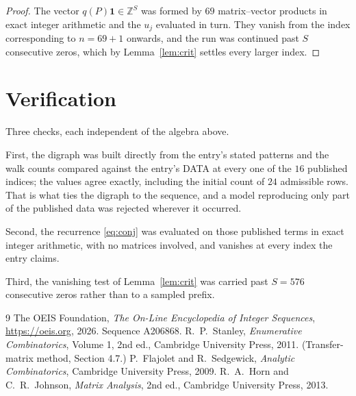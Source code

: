 \documentclass[11pt,a4paper]{article}
\theoremstyle{plain}
\theoremstyle{definition}
\begin{document}
\begin{proof}
The vector $q(P)\mathbf{1}\in\mathbb{Z}^{S}$ was formed by $69$ matrix--vector
products in exact integer arithmetic and the $u_j$ evaluated in turn. They vanish from the
index corresponding to $n=69+1$ onwards, and the run was continued past $S$ consecutive
zeros, which by Lemma~\ref{lem:crit} settles every larger index.
\end{proof}

\section{Verification}

Three checks, each independent of the algebra above.

First, the digraph was built directly from the entry's stated patterns and the walk counts
compared against the entry's DATA at every one of the $16$ published indices; the
values agree exactly, including the initial count of $24$ admissible rows. That is
what ties the digraph to the sequence, and a model reproducing only part of the published
data was rejected wherever it occurred.

Second, the recurrence \eqref{eq:conj} was evaluated on those published terms in exact
integer arithmetic, with no matrices involved, and vanishes at every index the entry claims.

Third, the vanishing test of Lemma~\ref{lem:crit} was carried past $S=576$ consecutive
zeros rather than to a sampled prefix.

\begin{thebibliography}{9}
 The OEIS Foundation, \emph{The On-Line Encyclopedia of Integer
Sequences}, \url{https://oeis.org}, 2026. Sequence A206868.
 R.~P.~Stanley, \emph{Enumerative Combinatorics}, Volume 1, 2nd ed.,
Cambridge University Press, 2011. (Transfer-matrix method, Section 4.7.)
 P.~Flajolet and R.~Sedgewick, \emph{Analytic Combinatorics}, Cambridge
University Press, 2009.
 R.~A.~Horn and C.~R.~Johnson, \emph{Matrix Analysis}, 2nd ed., Cambridge
University Press, 2013.
\end{thebibliography}
\end{document}
